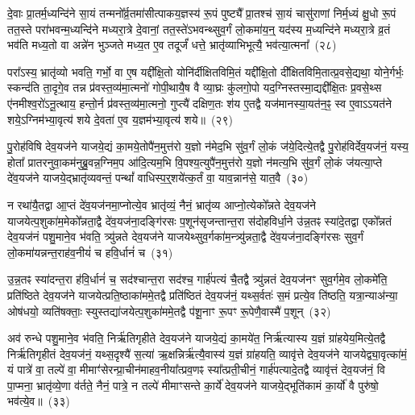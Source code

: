 दे॒वाः प्रा॒तर्म॒ध्यन्दि॑ने सा॒यं तन्मनो᳚र्व्र॒तमा॑सीत्पाकय॒ज्ञस्य॑ रू॒पं पुष्ट्यै᳚ प्रा॒तश्च॑ सा॒यं चासु॑राणां निर्म॒ध्यं क्षु॒धो रू॒पं तत॒स्ते परा॑भवन्म॒ध्यन्दि॑ने मध्यरा॒त्रे दे॒वानां॒ तत॒स्ते॑\-ऽभवन्थ्सुव॒र्गं लो॒कमा॑य॒न्॒ यद॑स्य म॒ध्यन्दि॑ने मध्यरा॒त्रे व्र॒तं भव॑ति मध्य॒तो वा अन्ने॑न भुञ्जते मध्य॒त ए॒व तदूर्जं॑ धत्ते॒ भ्रातृ॑व्याभिभूत्यै॒ भव॑त्या॒त्मना᳚~(२८)\ip




परा᳚\-ऽस्य॒ भ्रातृ॑व्यो भवति॒ गर्भो॒ वा ए॒ष यद्दी᳚क्षि॒तो योनि॑र्दीक्षितविमि॒तं यद्दी᳚क्षि॒तो दी᳚क्षितविमि॒तात्प्र॒वसे॒द्यथा॒ योने॒र्गर्भः॒ स्कन्द॑ति ता॒दृगे॒व तन्न प्र॑वस्त॒व्य॑मा॒त्मनो॑ गोपी॒थायै॒ष वै व्या॒घ्रः कु॑लगो॒पो यद॒ग्निस्तस्मा॒द्यद्दी᳚क्षि॒तः प्र॒वसे॒थ्स ए॑नमीश्व॒रो॑\-ऽनू॒त्थाय॒ हन्तो॒र्न प्र॑वस्त॒व्य॑मा॒त्मनो॒ गुप्त्यै॑ दक्षिण॒तः श॑य ए॒तद्वै यज॑मानस्या॒यत॑न॒ꣴ॒ स्व ए॒वा\-ऽऽयत॑ने शये॒\-ऽग्निम॑भ्या॒वृत्य॑ शये दे॒वता॑ ए॒व य॒ज्ञम॑भ्या॒वृत्य॑ शये॥~(२९)\ip

{\anuvakamend[{ए॒तद्वै क्रू॒र इ॒वैक॑व्रता आ॒त्मना॒ यज॑मानस्य॒ त्रयो॑दश च}]}

पु॒रोह॑विषि देव॒यज॑ने याजये॒द्यं का॒मये॒तोपै॑न॒मुत्त॑रो य॒ज्ञो न॑मेद॒भि सु॑व॒र्गं लो॒कं ज॑ये॒दित्ये॒तद्वै पु॒रोह॑विर्देव॒यज॑नं॒ यस्य॒ होता᳚ प्रातरनुवा॒कम॑नुब्रु॒वन्न॒ग्निम॒प आ॑दि॒त्यम॒भि वि॒पश्य॒त्युपै॑न॒मुत्त॑रो य॒ज्ञो न॑मत्य॒भि सु॑व॒र्गं लो॒कं ज॑यत्या॒प्ते दे॑व॒यज॑ने याजये॒द्भ्रातृ॑व्यवन्तं॒ पन्थां᳚ वाधिस्प॒र्॒\mbox{}शये॑त्क॒र्तं वा॒ याव॒न्नान॑से॒ यात॒वै~(३०)\ip

न रथा॑यै॒तद्वा आ॒प्तं दे॑व॒यज॑नमा॒प्नोत्ये॒व भ्रातृ॑व्यं॒ नैनं॒ भ्रातृ॑व्य आप्नो॒त्येको᳚न्नते देव॒यज॑ने याजयेत्प॒शुका॑म॒मेको᳚न्नता॒द्वै दे॑व॒यज॑ना॒दङ्गि॑रसः प॒शून॑सृजन्तान्त॒रा स॑दोहविर्धा॒ने उ॑न्न॒तꣴ स्या॑दे॒तद्वा एको᳚न्नतं देव॒यज॑नं पशु॒माने॒व भ॑वति॒ त्र्यु॑न्नते देव॒यज॑ने याजयेथ्सुव॒र्गका॑म॒न्त्र्यु॑न्नता॒द्वै दे॑व॒यज॑ना॒दङ्गि॑रसः सुव॒र्गं लो॒कमा॑यन्नन्त॒राह॑व॒नीयं॑ च हवि॒र्धानं॑ च~(३१)\ip

उ॒न्न॒तꣴ स्या॑दन्त॒रा ह॑वि॒र्धानं॑ च॒ सद॑श्चान्त॒रा सद॑श्च॒ गार्\mbox{}ह॑पत्यं चै॒तद्वै त्र्यु॑न्नतं देव॒यज॑नꣳ सुव॒र्गमे॒व लो॒कमे॑ति॒ प्रति॑ष्ठिते देव॒यज॑ने याजयेत्प्रति॒ष्ठाका॑ममे॒तद्वै प्रति॑ष्ठितं देव॒यज॑नं॒ यथ्स॒र्वतः॑ स॒मं प्रत्ये॒व ति॑ष्ठति॒ यत्रा॒न्याअ॑न्या॒ ओष॑धयो॒ व्यति॑षक्ताः॒ स्युस्तद्या॑जयेत्प॒शुका॑ममे॒तद्वै प॑शू॒नाꣳ रू॒पꣳ रू॒पेणै॒वास्मै॑ प॒शून्~(३२)\ip

अव॑ रुन्धे पशु॒माने॒व भ॑वति॒ निर्\mbox{}ऋ॑तिगृहीते देव॒यज॑ने याजये॒द्यं का॒मये॑त॒ निर्\mbox{}ऋ॑त्यास्य य॒ज्ञं ग्रा॑हयेय॒मित्ये॒तद्वै निर्\mbox{}ऋ॑तिगृहीतं देव॒यज॑नं॒ यथ्स॒दृश्यै॑ स॒त्या॑ ऋ॒क्षन्निर्\mbox{}ऋ॑त्यै॒वास्य॑ य॒ज्ञं ग्रा॑हयति॒ व्यावृ॑त्ते देव॒यज॑ने याजयेद्व्या॒वृत्का॑मं॒ यं पात्रे॑ वा॒ तल्पे॑ वा॒ मीमाꣳ॑सेरन्प्रा॒चीन॑माहव॒नीया᳚त्प्रव॒णꣴ स्या᳚त्प्रती॒चीनं॒ गार्\mbox{}ह॑पत्यादे॒तद्वै व्यावृ॑त्तं देव॒यज॑नं॒ वि पा॒प्मना॒ भ्रातृ॑व्ये॒णा व॑र्तते॒ नैनं॒ पात्रे॒ न तल्पे॑ मीमाꣳसन्ते का॒र्ये॑ देव॒यज॑ने याजये॒द्भूति॑कामं का॒र्यो॑ वै पुरु॑षो॒ भव॑त्ये॒व॥~(३३)\ip

